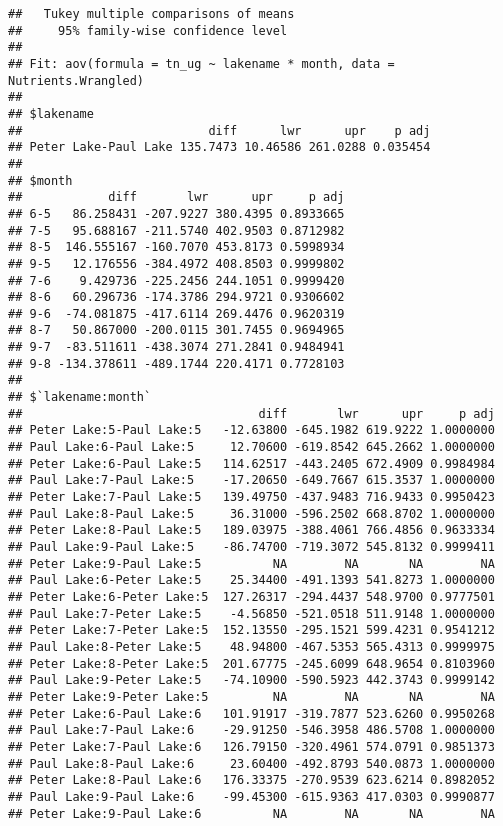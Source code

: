 \documentclass[]{article}
\begin{document}
\begin{verbatim}
##   Tukey multiple comparisons of means
##     95% family-wise confidence level
## 
## Fit: aov(formula = tn_ug ~ lakename * month, data = Nutrients.Wrangled)
## 
## $lakename
##                          diff      lwr      upr    p adj
## Peter Lake-Paul Lake 135.7473 10.46586 261.0288 0.035454
## 
## $month
##            diff       lwr      upr     p adj
## 6-5   86.258431 -207.9227 380.4395 0.8933665
## 7-5   95.688167 -211.5740 402.9503 0.8712982
## 8-5  146.555167 -160.7070 453.8173 0.5998934
## 9-5   12.176556 -384.4972 408.8503 0.9999802
## 7-6    9.429736 -225.2456 244.1051 0.9999420
## 8-6   60.296736 -174.3786 294.9721 0.9306602
## 9-6  -74.081875 -417.6114 269.4476 0.9620319
## 8-7   50.867000 -200.0115 301.7455 0.9694965
## 9-7  -83.511611 -438.3074 271.2841 0.9484941
## 9-8 -134.378611 -489.1744 220.4171 0.7728103
## 
## $`lakename:month`
##                                 diff       lwr      upr     p adj
## Peter Lake:5-Paul Lake:5   -12.63800 -645.1982 619.9222 1.0000000
## Paul Lake:6-Paul Lake:5     12.70600 -619.8542 645.2662 1.0000000
## Peter Lake:6-Paul Lake:5   114.62517 -443.2405 672.4909 0.9984984
## Paul Lake:7-Paul Lake:5    -17.20650 -649.7667 615.3537 1.0000000
## Peter Lake:7-Paul Lake:5   139.49750 -437.9483 716.9433 0.9950423
## Paul Lake:8-Paul Lake:5     36.31000 -596.2502 668.8702 1.0000000
## Peter Lake:8-Paul Lake:5   189.03975 -388.4061 766.4856 0.9633334
## Paul Lake:9-Paul Lake:5    -86.74700 -719.3072 545.8132 0.9999411
## Peter Lake:9-Paul Lake:5          NA        NA       NA        NA
## Paul Lake:6-Peter Lake:5    25.34400 -491.1393 541.8273 1.0000000
## Peter Lake:6-Peter Lake:5  127.26317 -294.4437 548.9700 0.9777501
## Paul Lake:7-Peter Lake:5    -4.56850 -521.0518 511.9148 1.0000000
## Peter Lake:7-Peter Lake:5  152.13550 -295.1521 599.4231 0.9541212
## Paul Lake:8-Peter Lake:5    48.94800 -467.5353 565.4313 0.9999975
## Peter Lake:8-Peter Lake:5  201.67775 -245.6099 648.9654 0.8103960
## Paul Lake:9-Peter Lake:5   -74.10900 -590.5923 442.3743 0.9999142
## Peter Lake:9-Peter Lake:5         NA        NA       NA        NA
## Peter Lake:6-Paul Lake:6   101.91917 -319.7877 523.6260 0.9950268
## Paul Lake:7-Paul Lake:6    -29.91250 -546.3958 486.5708 1.0000000
## Peter Lake:7-Paul Lake:6   126.79150 -320.4961 574.0791 0.9851373
## Paul Lake:8-Paul Lake:6     23.60400 -492.8793 540.0873 1.0000000
## Peter Lake:8-Paul Lake:6   176.33375 -270.9539 623.6214 0.8982052
## Paul Lake:9-Paul Lake:6    -99.45300 -615.9363 417.0303 0.9990877
## Peter Lake:9-Paul Lake:6          NA        NA       NA        NA

\end{verbatim}
\end{document}
